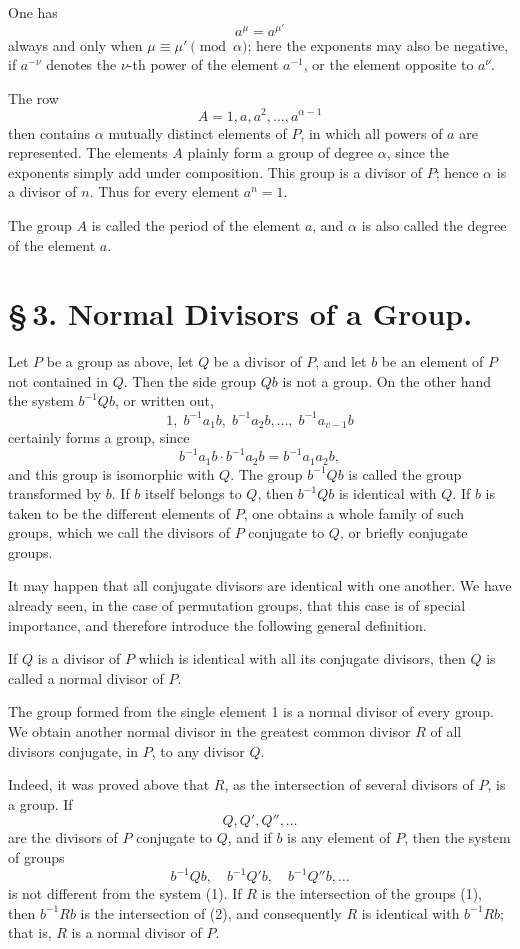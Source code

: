 \documentclass[11pt]{article}
\begin{document}
One has
\[
a^\mu=a^{\mu'}
\]
always and only when $\mu\equiv\mu'\pmod{\alpha}$; here the exponents may also be negative, if $a^{-\nu}$ denotes the $\nu$-th power of the element $a^{-1}$, or the element opposite to $a^\nu$.

The row
\[
A=1,a,a^2,\ldots,a^{\alpha-1}
\]
then contains $\alpha$ mutually distinct elements of $P$, in which all powers of $a$ are represented. The elements $A$ plainly form a group of degree $\alpha$, since the exponents simply add under composition. This group is a divisor of $P$; hence $\alpha$ is a divisor of $n$. Thus for every element $a^n=1$.

The group $A$ is called the period of the element $a$, and $\alpha$ is also called the degree of the element $a$.

\section*{\S\,3. Normal Divisors of a Group.}

Let $P$ be a group as above, let $Q$ be a divisor of $P$, and let $b$ be an element of $P$ not contained in $Q$. Then the side group $Qb$ is not a group. On the other hand the system $b^{-1}Qb$, or written out,
\[
1,\;b^{-1}a_1b,\;b^{-1}a_2b,\ldots,\;b^{-1}a_{v-1}b
\]
certainly forms a group, since
\[
b^{-1}a_1b\cdot b^{-1}a_2b=b^{-1}a_1a_2b,
\]
and this group is isomorphic with $Q$. The group $b^{-1}Qb$ is called the group transformed by $b$. If $b$ itself belongs to $Q$, then $b^{-1}Qb$ is identical with $Q$. If $b$ is taken to be the different elements of $P$, one obtains a whole family of such groups, which we call the divisors of $P$ conjugate to $Q$, or briefly conjugate groups.

It may happen that all conjugate divisors are identical with one another. We have already seen, in the case of permutation groups, that this case is of special importance, and therefore introduce the following general definition.

If $Q$ is a divisor of $P$ which is identical with all its conjugate divisors, then $Q$ is called a normal divisor of $P$.

The group formed from the single element 1 is a normal divisor of every group. We obtain another normal divisor in the greatest common divisor $R$ of all divisors conjugate, in $P$, to any divisor $Q$.

Indeed, it was proved above that $R$, as the intersection of several divisors of $P$, is a group. If
\begin{equation}
Q,Q',Q'',\ldots
\tag{1}
\end{equation}
are the divisors of $P$ conjugate to $Q$, and if $b$ is any element of $P$, then the system of groups
\begin{equation}
b^{-1}Qb,
\quad b^{-1}Q'b,
\quad b^{-1}Q''b,
\ldots
\tag{2}
\end{equation}
is not different from the system (1). If $R$ is the intersection of the groups (1), then $b^{-1}Rb$ is the intersection of (2), and consequently $R$ is identical with $b^{-1}Rb$; that is, $R$ is a normal divisor of $P$.
\end{document}
